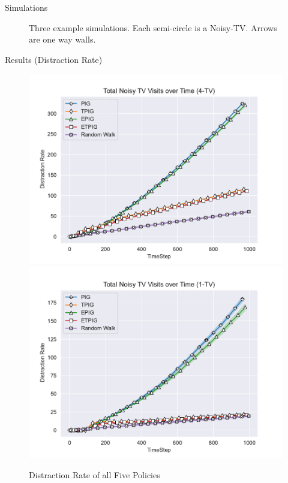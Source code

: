 \begin{frame}[fragile]{Simulations}
\begin{figure}
\begin{center}
			\end{center}
			\caption{Three example simulations. Each semi-circle is a Noisy-TV. Arrows are one way walls.}
			\label{Fig:Sim}
		\end{figure}
	\end{frame}
	
	\begin{frame}[fragile]{Results (Distraction Rate)}
		\begin{figure}
			\begin{center}
				\includegraphics[scale=0.40]{"../images/Distraction_Rate_4-TV.pdf"}
				\includegraphics[scale=0.40]{"../images/Distraction_Rate_1-TV.pdf"}
			\end{center}
			\caption{Distraction Rate of all Five Policies}
		\end{figure}
	\end{frame}
	
